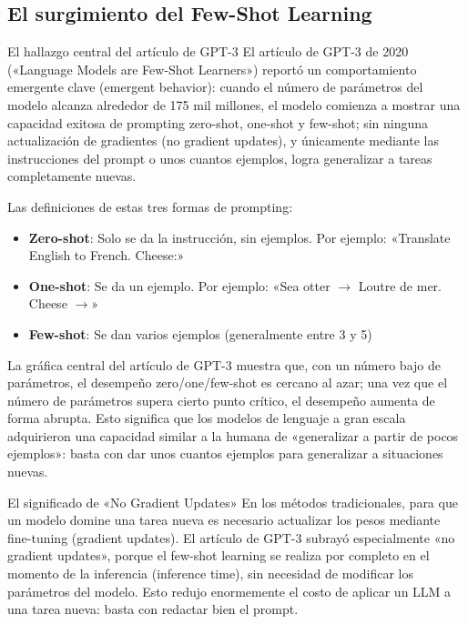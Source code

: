 \documentclass[a4paper]{article}
\begin{document}
\subsection{El surgimiento del Few-Shot Learning}

\begin{importantbox}{El hallazgo central del artículo de GPT-3}
El artículo de GPT-3 de 2020 («Language Models are Few-Shot Learners») reportó un comportamiento emergente clave (emergent behavior): cuando el número de parámetros del modelo alcanza alrededor de 175 mil millones, el modelo comienza a mostrar una capacidad exitosa de prompting zero-shot, one-shot y few-shot; sin ninguna actualización de gradientes (no gradient updates), y únicamente mediante las instrucciones del prompt o unos cuantos ejemplos, logra generalizar a tareas completamente nuevas.
\end{importantbox}

Las definiciones de estas tres formas de prompting:

\begin{itemize}
    \item \textbf{Zero-shot}: Solo se da la instrucción, sin ejemplos. Por ejemplo: «Translate English to French. Cheese:»
    \item \textbf{One-shot}: Se da un ejemplo. Por ejemplo: «Sea otter $\rightarrow$ Loutre de mer. Cheese $\rightarrow$»
    \item \textbf{Few-shot}: Se dan varios ejemplos (generalmente entre 3 y 5)
\end{itemize}

La gráfica central del artículo de GPT-3 muestra que, con un número bajo de parámetros, el desempeño zero/one/few-shot es cercano al azar; una vez que el número de parámetros supera cierto punto crítico, el desempeño aumenta de forma abrupta. Esto significa que los modelos de lenguaje a gran escala adquirieron una capacidad similar a la humana de «generalizar a partir de pocos ejemplos»: basta con dar unos cuantos ejemplos para generalizar a situaciones nuevas.

\begin{knowledgebox}{El significado de «No Gradient Updates»}
En los métodos tradicionales, para que un modelo domine una tarea nueva es necesario actualizar los pesos mediante fine-tuning (gradient updates). El artículo de GPT-3 subrayó especialmente «no gradient updates», porque el few-shot learning se realiza por completo en el momento de la inferencia (inference time), sin necesidad de modificar los parámetros del modelo. Esto redujo enormemente el costo de aplicar un LLM a una tarea nueva: basta con redactar bien el prompt.
\end{knowledgebox}
\end{document}
